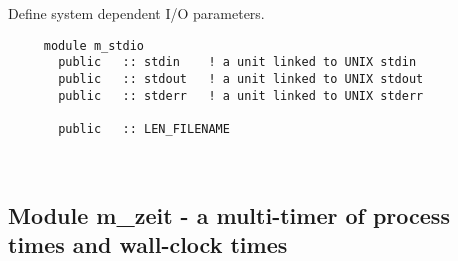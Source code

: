   	Define system dependent I/O parameters.
  
\begin{verbatim} 
     module m_stdio
       public	:: stdin	! a unit linked to UNIX stdin
       public	:: stdout	! a unit linked to UNIX stdout
       public	:: stderr	! a unit linked to UNIX stderr
 
       public	:: LEN_FILENAME
 \end{verbatim}%


 
\mbox{}\hrulefill\ 
 
  \subsection{Module m\_zeit - a multi-timer of process times and wall-clock times }

